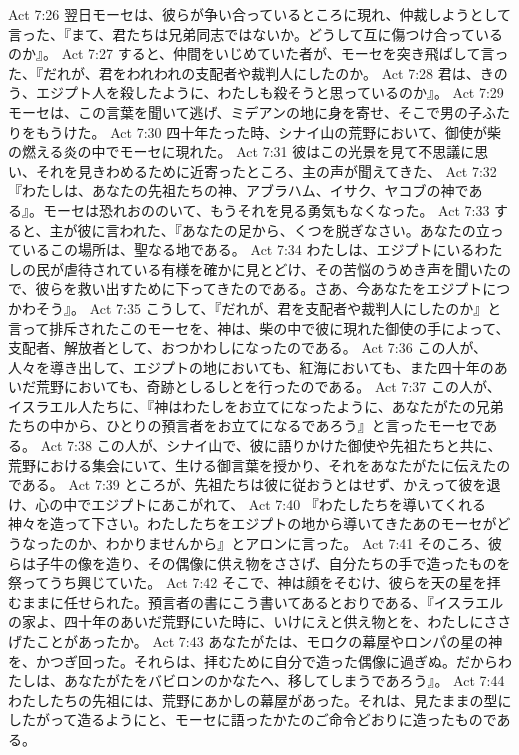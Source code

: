Act 7:26  翌日モーセは、彼らが争い合っているところに現れ、仲裁しようとして言った、『まて、君たちは兄弟同志ではないか。どうして互に傷つけ合っているのか』。
Act 7:27  すると、仲間をいじめていた者が、モーセを突き飛ばして言った、『だれが、君をわれわれの支配者や裁判人にしたのか。
Act 7:28  君は、きのう、エジプト人を殺したように、わたしも殺そうと思っているのか』。
Act 7:29  モーセは、この言葉を聞いて逃げ、ミデアンの地に身を寄せ、そこで男の子ふたりをもうけた。
Act 7:30  四十年たった時、シナイ山の荒野において、御使が柴の燃える炎の中でモーセに現れた。
Act 7:31  彼はこの光景を見て不思議に思い、それを見きわめるために近寄ったところ、主の声が聞えてきた、
Act 7:32  『わたしは、あなたの先祖たちの神、アブラハム、イサク、ヤコブの神である』。モーセは恐れおののいて、もうそれを見る勇気もなくなった。
Act 7:33  すると、主が彼に言われた、『あなたの足から、くつを脱ぎなさい。あなたの立っているこの場所は、聖なる地である。
Act 7:34  わたしは、エジプトにいるわたしの民が虐待されている有様を確かに見とどけ、その苦悩のうめき声を聞いたので、彼らを救い出すために下ってきたのである。さあ、今あなたをエジプトにつかわそう』。
Act 7:35  こうして、『だれが、君を支配者や裁判人にしたのか』と言って排斥されたこのモーセを、神は、柴の中で彼に現れた御使の手によって、支配者、解放者として、おつかわしになったのである。
Act 7:36  この人が、人々を導き出して、エジプトの地においても、紅海においても、また四十年のあいだ荒野においても、奇跡としるしとを行ったのである。
Act 7:37  この人が、イスラエル人たちに、『神はわたしをお立てになったように、あなたがたの兄弟たちの中から、ひとりの預言者をお立てになるであろう』と言ったモーセである。
Act 7:38  この人が、シナイ山で、彼に語りかけた御使や先祖たちと共に、荒野における集会にいて、生ける御言葉を授かり、それをあなたがたに伝えたのである。
Act 7:39  ところが、先祖たちは彼に従おうとはせず、かえって彼を退け、心の中でエジプトにあこがれて、
Act 7:40  『わたしたちを導いてくれる神々を造って下さい。わたしたちをエジプトの地から導いてきたあのモーセがどうなったのか、わかりませんから』とアロンに言った。
Act 7:41  そのころ、彼らは子牛の像を造り、その偶像に供え物をささげ、自分たちの手で造ったものを祭ってうち興じていた。
Act 7:42  そこで、神は顔をそむけ、彼らを天の星を拝むままに任せられた。預言者の書にこう書いてあるとおりである、『イスラエルの家よ、四十年のあいだ荒野にいた時に、いけにえと供え物とを、わたしにささげたことがあったか。
Act 7:43  あなたがたは、モロクの幕屋やロンパの星の神を、かつぎ回った。それらは、拝むために自分で造った偶像に過ぎぬ。だからわたしは、あなたがたをバビロンのかなたへ、移してしまうであろう』。
Act 7:44  わたしたちの先祖には、荒野にあかしの幕屋があった。それは、見たままの型にしたがって造るようにと、モーセに語ったかたのご命令どおりに造ったものである。

